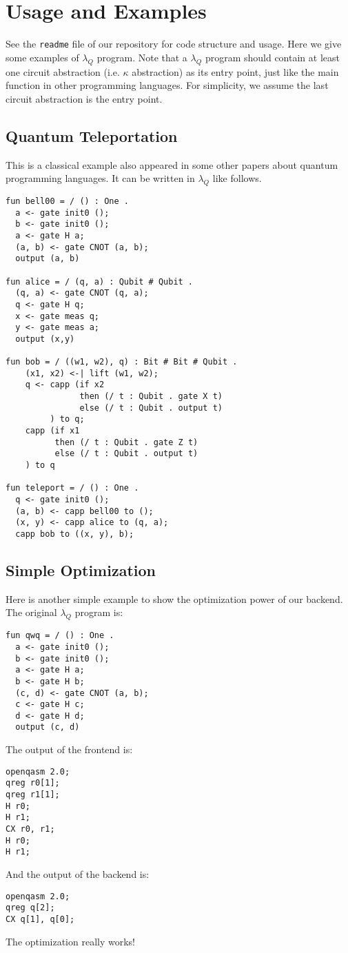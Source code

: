 \section{Usage and Examples}

See the \texttt{readme} file of our repository for code structure and usage.
Here we give some examples of $\lambda_Q$ program.
Note that a $\lambda_Q$ program should contain at least one circuit abstraction (i.e. $\kappa$ abstraction) as its entry point, just like the main function in other programming languages.
For simplicity, we assume the last circuit abstraction is the entry point.


\subsection{Quantum Teleportation}

This is a classical example also appeared in some other papers about quantum programming languages.
It can be written in $\lambda_Q$ like follows.

\begin{lstlisting}[language=Lambda]
fun bell00 = / () : One .
  a <- gate init0 ();
  b <- gate init0 ();
  a <- gate H a;
  (a, b) <- gate CNOT (a, b);
  output (a, b)

fun alice = / (q, a) : Qubit # Qubit .
  (q, a) <- gate CNOT (q, a);
  q <- gate H q;
  x <- gate meas q;
  y <- gate meas a;
  output (x,y)

fun bob = / ((w1, w2), q) : Bit # Bit # Qubit .
    (x1, x2) <-| lift (w1, w2);
    q <- capp (if x2
               then (/ t : Qubit . gate X t)
               else (/ t : Qubit . output t)
         ) to q;
    capp (if x1
          then (/ t : Qubit . gate Z t)
          else (/ t : Qubit . output t)
    ) to q

fun teleport = / () : One .
  q <- gate init0 ();
  (a, b) <- capp bell00 to ();
  (x, y) <- capp alice to (q, a);
  capp bob to ((x, y), b);
\end{lstlisting}

\subsection{Simple Optimization}
Here is another simple example to show the optimization power of our backend.
The original $\lambda_Q$ program is:
\begin{lstlisting}[language=lambda]
fun qwq = / () : One .
  a <- gate init0 ();
  b <- gate init0 ();
  a <- gate H a;
  b <- gate H b;
  (c, d) <- gate CNOT (a, b);
  c <- gate H c;
  d <- gate H d;
  output (c, d)
\end{lstlisting}

The output of the frontend is:
\begin{lstlisting}[language=lambda]
openqasm 2.0;
qreg r0[1];
qreg r1[1];
H r0;
H r1;
CX r0, r1;
H r0;
H r1;
\end{lstlisting}

And the output of the backend is:
\begin{lstlisting}[language=lambda]
openqasm 2.0;
qreg q[2];
CX q[1], q[0];
\end{lstlisting}

The optimization really works!